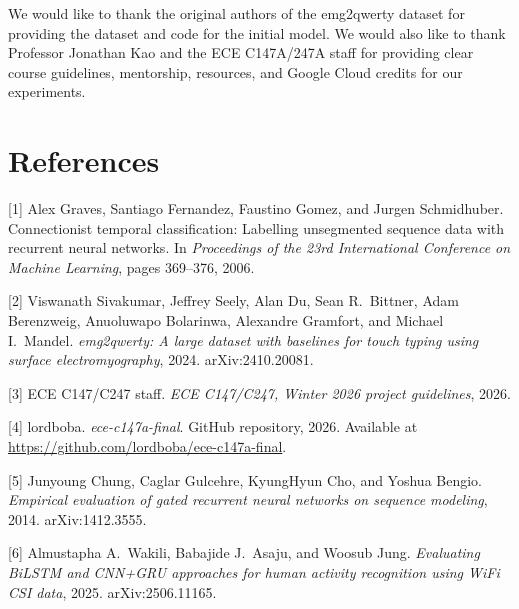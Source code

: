 \documentclass{article}
\begin{document}
\begin{ack}
	We would like to thank the original authors of the emg2qwerty dataset
	for providing the dataset and code for the initial model. We would also like to thank
	Professor Jonathan Kao and the ECE C147A/247A staff for providing clear course guidelines,
	mentorship, resources, and Google Cloud credits for our experiments.
\end{ack}

\section*{References}

[1] Alex Graves, Santiago Fernandez, Faustino Gomez, and Jurgen Schmidhuber.
Connectionist temporal classification: Labelling unsegmented sequence data with
recurrent neural networks. In \textit{Proceedings of the 23rd International
	Conference on Machine Learning}, pages 369--376, 2006.

	[2] Viswanath Sivakumar, Jeffrey Seely, Alan Du, Sean R.\ Bittner, Adam
Berenzweig, Anuoluwapo Bolarinwa, Alexandre Gramfort, and Michael I.\ Mandel.
\textit{emg2qwerty: A large dataset with baselines for touch typing using
	surface electromyography}, 2024. arXiv:2410.20081.

[3] ECE C147/C247 staff. \textit{ECE C147/C247, Winter 2026 project
	guidelines}, 2026.

[4] lordboba. \textit{ece-c147a-final}. GitHub repository, 2026. Available at
\url{https://github.com/lordboba/ece-c147a-final}.

[5] Junyoung Chung, Caglar Gulcehre, KyungHyun Cho, and Yoshua Bengio.
\textit{Empirical evaluation of gated recurrent neural networks on sequence
	modeling}, 2014. arXiv:1412.3555.

[6] Almustapha A.\ Wakili, Babajide J.\ Asaju, and Woosub Jung.
\textit{Evaluating BiLSTM and CNN+GRU approaches for human activity recognition
	using WiFi CSI data}, 2025. arXiv:2506.11165.
\end{document}
